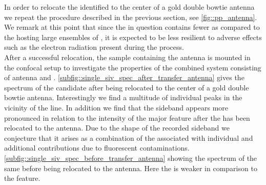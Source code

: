 				In order to relocate the identified \nd to the center of a gold double bowtie antenna we repeat the \pp procedure described in the previous section, see \cref{fig::pp_antenna}. We remark at this point that since the \nd in question contains fewer \sivs as compared to the \nds hosting large ensembles of \sivs, it is expected to be less resilient to adverse effects such as the electron radiation present during the \pp process.
				\\
				After a successful relocation, the sample containing the antenna is mounted in the confocal setup to investigate the properties of the combined system consisting of antenna and \sivs. \cref{subfig::single_siv_spec_after_transfer_antenna} gives the spectrum of the candidate \nd after being relocated to the center of a gold double bowtie antenna. Interestingly we find a multitude of individual peaks in the vicinity of the \siv \zpl line. In addition we find that the sideband appears more pronounced in relation to the intensity of the major feature after the \nd has been relocated to the antenna. Due to the shape of the recorded sideband we conjecture that it arises as a combination of the \psbs associated with individual \sivs and additional contributions due to fluorescent contaminations. \cref{subfig::single_siv_spec_before_transfer_antenna} showing the spectrum of the same \nd before being relocated to the antenna. Here the \psb is weaker in comparison to the \zpl feature.


